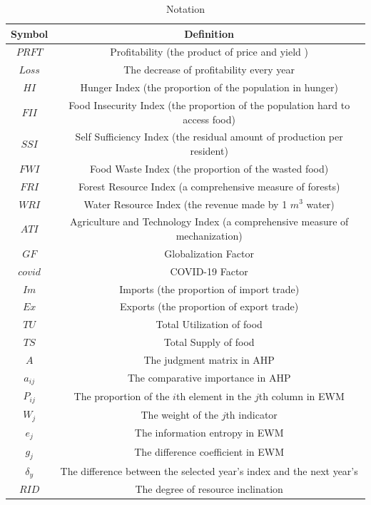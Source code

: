\documentclass{mcmthesis}
\begin{document}
 
 \begin{table}[H]
	\centering
	\caption{Notation}
	\begin{tabular}{ c c }
	\toprule
	  Symbol &Definition\\
	\midrule
	$PRFT$ & Profitability (the product of price and yield )\\
	$Loss$ &The decrease of profitability every year \\
	 $HI$ & Hunger Index (the proportion of
the population in hunger) \\	
	 $FII$ & Food Insecurity Index (the proportion of the population hard to access food)\\
	 $SSI$& Self Sufficiency Index (the residual amount of production per resident) \\
	 $FWI$ & Food Waste Index (the proportion of the wasted food)\\
	$FRI$ & Forest Resource Index (a comprehensive measure of forests) \\
	$WRI$ & Water Resource Index (the revenue made by 1 $m^3$ water)\\
	$ATI$ & Agriculture and Technology Index (a comprehensive measure of mechanization) \\
	$GF$ & Globalization Factor\\
	$covid$ & COVID-19 Factor\\
	$Im$ & Imports (the proportion of import trade)\\
	$Ex$ & Exports (the proportion of export trade)\\
	$TU$ & Total Utilization of food\\
	$TS$ & Total Supply of food\\
	$A$ & The judgment matrix in AHP\\
	$a_{ij}$ & The comparative importance in AHP\\
	$P_{ij}$&The proportion of the $i$th element in the $j$th column in EWM\\
	$W_j$ & The weight of the $j$th indicator\\
	$e_j$ & The information entropy in EWM\\
	$g_j$ & The difference coefficient in EWM\\
	$\delta_y$&  The difference between the selected year's index and the next year's\\
	$RID$ & The degree of resource inclination\\
    \bottomrule
	\end{tabular}
	\label{tbl:notation}
\end{table}
\end{document}
